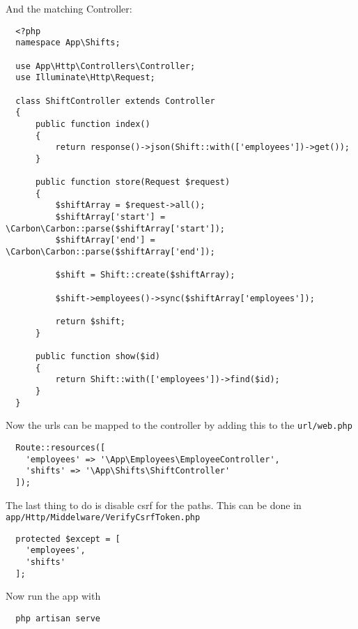 And the matching Controller:
\begin{verbatim}
  <?php
  namespace App\Shifts;

  use App\Http\Controllers\Controller;
  use Illuminate\Http\Request;

  class ShiftController extends Controller
  {
      public function index()
      {
          return response()->json(Shift::with(['employees'])->get());
      }
      
      public function store(Request $request)
      {
          $shiftArray = $request->all();
          $shiftArray['start'] = \Carbon\Carbon::parse($shiftArray['start']);
          $shiftArray['end'] = \Carbon\Carbon::parse($shiftArray['end']);

          $shift = Shift::create($shiftArray);

          $shift->employees()->sync($shiftArray['employees']);

          return $shift;
      }

      public function show($id)
      {
          return Shift::with(['employees'])->find($id);
      }
  }
\end{verbatim}

Now the urls can be mapped to the controller by adding this to the \texttt{url/web.php}
\begin{verbatim}
  Route::resources([
    'employees' => '\App\Employees\EmployeeController',
    'shifts' => '\App\Shifts\ShiftController'
  ]);
\end{verbatim}

The last thing to do is disable csrf for the paths. This can be done in \texttt{app/Http/Middelware/VerifyCsrfToken.php}
\begin{verbatim}
  protected $except = [
    'employees',
    'shifts'
  ];
\end{verbatim}

Now run the app with
\begin{verbatim}
  php artisan serve
\end{verbatim}
